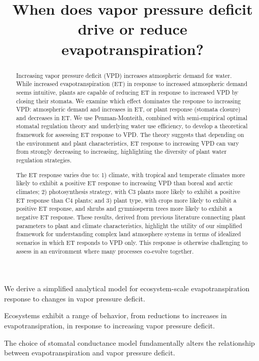 \documentclass[draft]{agujournal2019}
\begin{document}
\title{When does vapor pressure deficit drive or reduce
  evapotranspiration?}





\begin{keypoints}
\item We derive a simplified analytical model for ecosystem-scale
  evapotranspiration response to changes in vapor pressure deficit.
\item Ecosystems exhibit a range of behavior, from reductions to
  increases in evapotransipration, in response to increasing vapor
  pressure deficit.
\item The choice of stomatal conductance model fundamentally alters
  the relationship between evapotranspiration and vapor pressure
  deficit.
\end{keypoints}

\begin{abstract}
Increasing vapor pressure deficit (VPD) increases atmospheric demand
for water. While increased evapotranspiration (ET) in response to
increased atmospheric demand seems intuitive, plants are capable of
reducing ET in response to increased VPD by closing their stomata. We
examine which effect dominates the response to increasing VPD:
atmospheric demand and increases in ET, or plant response (stomata
closure) and decreases in ET. We use Penman-Monteith, combined with
semi-empirical optimal stomatal regulation theory and underlying water
use efficiency, to develop a theoretical framework for assessing ET
response to VPD. The theory suggests that depending on the environment
and plant characteristics, ET response to increasing VPD can vary from
strongly decreasing to increasing, highlighting the diversity of plant
water regulation strategies.

The ET response varies due to: 1) climate, with tropical and temperate
climates more likely to exhibit a positive ET response to increasing
VPD than boreal and arctic climates; 2) photosynthesis strategy, with
C3 plants more likely to exhibit a positive ET response than C4
plants; and 3) plant type, with crops more likely to exhibit a
positive ET response, and shrubs and gymniosperm trees more likely to
exhibit a negative ET response. These results, derived from previous
literature connecting plant parameters to plant and climate
characteristics, highlight the utility of our simplified framework for
understanding complex land atmosphere systems in terms of idealized
scenarios in which ET responds to VPD only. This response is otherwise
challenging to assess in an environment where many processes co-evolve
together.
\end{abstract}
\end{document}
